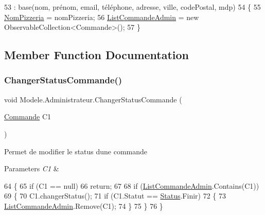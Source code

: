 \begin{DoxyCode}
53             : base(nom, prénom, email, téléphone, adresse, ville, codePostal, mdp)
54         \{
55             \hyperlink{classModele_1_1Administrateur_addbed2fd93cf904a6703d8debd758313}{NomPizzeria} = nomPizzeria;
56             \hyperlink{classModele_1_1Administrateur_ad73b7b5b20cd940be7176a42cffda851}{ListCommandeAdmin} = \textcolor{keyword}{new} ObservableCollection<Commande>();
57         \}
\end{DoxyCode}


\subsection{Member Function Documentation}
\mbox{\label{classModele_1_1Administrateur_a8a5f3e9868bb6c19d0b62f572d9d997d}} 
\subsubsection{\texorpdfstring{Changer\+Status\+Commande()}{ChangerStatusCommande()}}
{\footnotesize\ttfamily void Modele.\+Administrateur.\+Changer\+Status\+Commande (\begin{DoxyParamCaption}\item[{\hyperlink{classModele_1_1Commande}{Commande}}]{C1 }\end{DoxyParamCaption})\hspace{0.3cm}{\ttfamily [inline]}}



Permet de modifier le status d\textquotesingle{}une commande 


\begin{DoxyParams}{Parameters}
{\em C1} & \\
\hline
\end{DoxyParams}

\begin{DoxyCode}
64         \{
65             \textcolor{keywordflow}{if} (C1 == null)
66                 \textcolor{keywordflow}{return};
67 
68             \textcolor{keywordflow}{if} (\hyperlink{classModele_1_1Administrateur_ad73b7b5b20cd940be7176a42cffda851}{ListCommandeAdmin}.Contains(C1))
69             \{
70                 C1.changerStatus();
71                 \textcolor{keywordflow}{if} (C1.Statut == \hyperlink{namespaceModele_a7de67c7bf55b42ee1c5fea81ed793eb1}{Status}.Finir)
72                 \{
73                     \hyperlink{classModele_1_1Administrateur_ad73b7b5b20cd940be7176a42cffda851}{ListCommandeAdmin}.Remove(C1);
74                 \}
75             \}
76         \}
\end{DoxyCode}
\mbox{\label{classModele_1_1Administrateur_af58fa8152718abdae5eb6e9b1bb01017}} 
